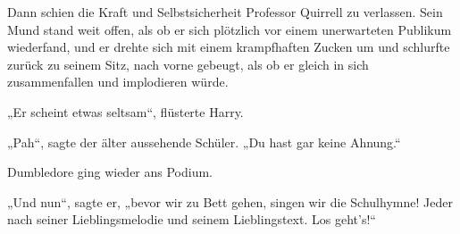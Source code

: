 Dann schien die Kraft und Selbstsicherheit Professor Quirrell zu verlassen. Sein Mund stand weit offen, als ob er sich plötzlich vor einem unerwarteten Publikum wiederfand, und er drehte sich mit einem krampfhaften Zucken um und schlurfte zurück zu seinem Sitz, nach vorne gebeugt, als ob er gleich in sich zusammenfallen und implodieren würde.

„Er scheint etwas seltsam“, flüsterte Harry.

„Pah“, sagte der älter aussehende Schüler. „Du hast gar keine Ahnung.“

Dumbledore ging wieder ans Podium.

„Und nun“, sagte er, „bevor wir zu Bett gehen, singen wir die Schulhymne! Jeder nach seiner Lieblingsmelodie und seinem Lieblingstext. Los geht’s!“

